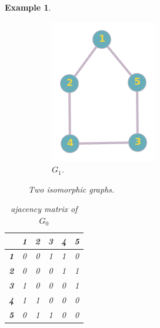 \documentclass[12pt,a4paper]{article}
\newtheorem{exa}[thm]{Example}
\begin{document}
\begin{exa}
\begin{figure}[h!]
\begin{subfigure}[b]{.24\linewidth}
		\includegraphics[width=\linewidth]{ex1_2.png}
		\caption{$G_1$.}
	\end{subfigure}
	\caption{Two isomorphic graphs.}
	\label{fig:Two isomorphic graphs}
\end{figure}
\begin{table}[!htb]
	\begin{minipage}{.5\linewidth}
		
		\centering
		\begin{tabular}{|c|c|c|c|c|c|}
			\hline 
			& \textbf{1} & \textbf{2} & \textbf{3} & \textbf{4} & \textbf{5} \\ 
			\hline 
			\textbf{1} & 0 & 0 & 1 & 1 & 0 \\ 
			\hline 
			\textbf{2} & 0 & 0 & 0 & 1 & 1 \\ 
			\hline 
			\textbf{3} & 1 & 0 & 0 & 0 & 1 \\ 
			\hline 
			\textbf{4} & 1 & 1 & 0 & 0 & 0 \\ 
			\hline 
			\textbf{5} & 0 & 1 & 1 & 0 & 0 \\ 
			\hline  
		\end{tabular} 
	\caption{ajacency matrix of $G_0$}
	\end{minipage}%
	\begin{minipage}{.5\linewidth}
		\centering


\end{minipage}
\end{table}
\end{exa}
\end{document}
